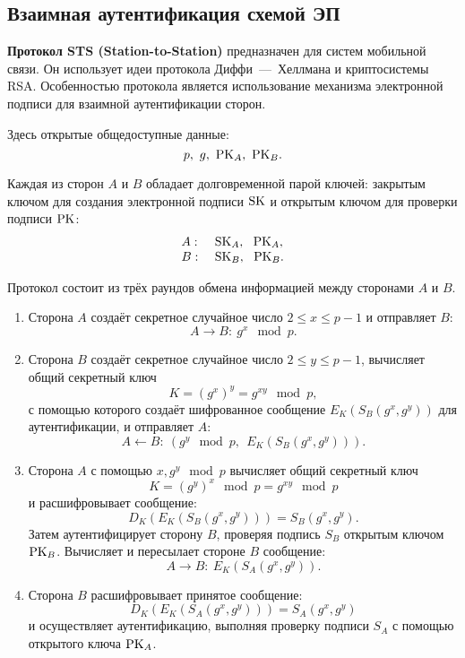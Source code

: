 \subsection{Взаимная аутентификация схемой ЭП}

\textbf{Протокол STS (Station-to-Station)} предназначен для систем мобильной связи. Он использует идеи протокола Диффи~---~Хеллмана и криптосистемы RSA. Особенностью протокола является использование механизма электронной подписи для взаимной аутентификации сторон.

Здесь открытые общедоступные данные:
    \[ p, ~ g, ~ \textrm{PK}_A, ~ \textrm{PK}_B. \]

Каждая из сторон $A$ и $B$ обладает долговременной парой ключей: закрытым ключом для создания электронной подписи $\textrm{SK}$ и открытым ключом для проверки подписи $\textrm{PK}$:
\[ \begin{array}{ll}
    A: & ~ \textrm{SK}_A, ~~ \textrm{PK}_A, \\
    B: & ~ \textrm{SK}_B, ~~ \textrm{PK}_B. \\
\end{array} \]

Протокол состоит из трёх раундов обмена информацией между сторонами $A$ и $B$.
\begin{enumerate}
    \item Сторона $A$ создаёт секретное случайное число $2 \leq x \leq p-1$ и отправляет $B$:
            \[ A \rightarrow B: ~ g^x \mod p. \]
    \item Сторона $B$ создаёт секретное случайное число $2 \leq y \leq p-1$, вычисляет общий секретный ключ
            \[ K = (g^x)^y = g^{xy} \mod p, \]
        с помощью которого создаёт шифрованное сообщение $E_K(S_B(g^x, g^y))$ для аутентификации, и отправляет $A$:
            \[ A \leftarrow B: ~ \left( g^y \mod p, ~~ E_K( S_B( g^x, g^y)) \right). \]
    \item Сторона $A$ с помощью $x, g^y \mod p$ вычисляет общий секретный ключ
            \[ K = (g^y)^x \mod p = g^{xy} \mod p \]
        и расшифровывает сообщение:
            \[ D_K( E_K( S_B( g^x, g^y))) = S_B( g^x, g^y). \]
            Затем аутентифицирует сторону $B$, проверяя подпись $S_B$ открытым ключом $\textrm{PK}_B$. Вычисляет и пересылает стороне $B$ сообщение:
            \[ A \rightarrow B: ~ E_K( S_A( g^x, g^y)). \]
    \item Сторона $B$ расшифровывает принятое сообщение:
            \[ D_K( E_K( S_A( g^x, g^y))) = S_A( g^x, g^y) \]
        и осуществляет аутентификацию, выполняя проверку подписи $S_A$ с помощью открытого ключа $\textrm{PK}_A$.
\end{enumerate}
